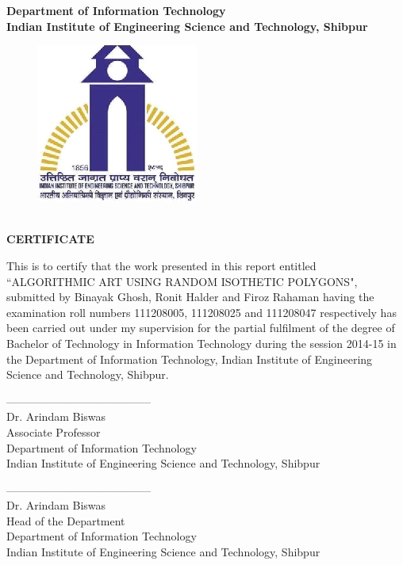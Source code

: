 \documentclass[12pt]{article}
\begin{document}
\newpage




\thispagestyle{empty}
\begin{center}
  \large \textbf{Department of Information Technology\\
  Indian Institute of Engineering Science and Technology, Shibpur}
\begin{figure}
  \centering
  \includegraphics[scale=1]{Logo_IIEST.eps}\\
\end{figure}
\\
 \vspace{1cm}
 \huge \textbf{CERTIFICATE}
 \vspace{1cm}
\end{center}
This is to certify that the work presented in this report entitled ``ALGORITHMIC ART USING RANDOM ISOTHETIC POLYGONS", submitted by Binayak Ghosh, Ronit Halder and Firoz Rahaman having the examination roll numbers 111208005, 111208025 and 111208047 respectively has been carried out under my supervision for the partial fulfilment of the degree of Bachelor of Technology in Information Technology during the session 2014-15 in the Department of Information Technology, Indian Institute of Engineering Science and Technology, Shibpur.\\
\vspace{1.5cm}

\begin{minipage}[t]{0.48\linewidth}
\begin{flushleft}
---------------------------------------\\
Dr. Arindam Biswas\\
Associate Professor\\
Department of Information Technology\\
Indian Institute of Engineering Science and Technology, Shibpur
\end{flushleft}
\end{minipage}\hfill
\begin{minipage}[t]{0.48\linewidth}
\begin{flushright}
---------------------------------------\\
Dr. Arindam Biswas\\
Head of the Department\\
Department of Information Technology\\
Indian Institute of Engineering Science and Technology, Shibpur
\end{flushright}
\end{minipage}
\vspace{1.5cm}
\end{document}
